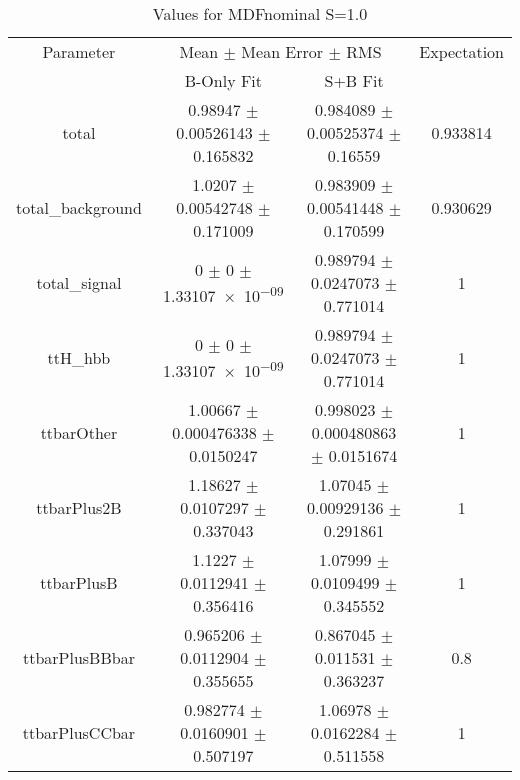 \begin{table}
\centering
\caption{Values for MDFnominal S=1.0}
\begin{tabular}{cccc}
\toprule
Parameter & \multicolumn{2}{c}{Mean $\pm$ Mean Error $\pm$ RMS} & Expectation\\
 & B-Only Fit & S+B Fit & \\
\midrule
total & \num{0.98947} $\pm$ \num{0.00526143} $\pm$ \num{0.165832} & \num{0.984089} $\pm$ \num{0.00525374} $\pm$ \num{0.16559} & \num{0.933814}\\
total\_background & \num{1.0207} $\pm$ \num{0.00542748} $\pm$ \num{0.171009} & \num{0.983909} $\pm$ \num{0.00541448} $\pm$ \num{0.170599} & \num{0.930629}\\
total\_signal & \num{0} $\pm$ \num{0} $\pm$ \num{1.33107e-09} & \num{0.989794} $\pm$ \num{0.0247073} $\pm$ \num{0.771014} & \num{1}\\
ttH\_hbb & \num{0} $\pm$ \num{0} $\pm$ \num{1.33107e-09} & \num{0.989794} $\pm$ \num{0.0247073} $\pm$ \num{0.771014} & \num{1}\\
ttbarOther & \num{1.00667} $\pm$ \num{0.000476338} $\pm$ \num{0.0150247} & \num{0.998023} $\pm$ \num{0.000480863} $\pm$ \num{0.0151674} & \num{1}\\
ttbarPlus2B & \num{1.18627} $\pm$ \num{0.0107297} $\pm$ \num{0.337043} & \num{1.07045} $\pm$ \num{0.00929136} $\pm$ \num{0.291861} & \num{1}\\
ttbarPlusB & \num{1.1227} $\pm$ \num{0.0112941} $\pm$ \num{0.356416} & \num{1.07999} $\pm$ \num{0.0109499} $\pm$ \num{0.345552} & \num{1}\\
ttbarPlusBBbar & \num{0.965206} $\pm$ \num{0.0112904} $\pm$ \num{0.355655} & \num{0.867045} $\pm$ \num{0.011531} $\pm$ \num{0.363237} & \num{0.8}\\
ttbarPlusCCbar & \num{0.982774} $\pm$ \num{0.0160901} $\pm$ \num{0.507197} & \num{1.06978} $\pm$ \num{0.0162284} $\pm$ \num{0.511558} & \num{1}\\
\bottomrule
\end{tabular}
\end{table}